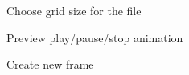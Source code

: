 \documentclass[11pt]{article} %
\begin{document}
\begin{figure}[H]
	\centering
	\caption{Choose grid size for the file}
	\label{fig:UC7}
\end{figure}

\begin{figure}[H]
	\centering
	\caption{Preview play/pause/stop animation}
	\label{fig:UC8}
\end{figure}

\begin{figure}[H]
	\centering
	\caption{Create new frame}
	\label{fig:UC9}
\end{figure}
\end{document}
